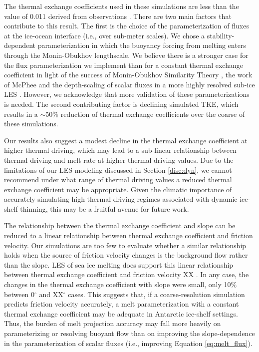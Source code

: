 \documentclass[draft]{agujournal2019}
\begin{document}
The thermal exchange coefficients used in these simulations are less than the value of 0.011 derived from observations \cite{jenkins_observation_2010}. There are two main factors that contribute to this result. The first is the choice of the parameterization of fluxes at the ice-ocean interface (i.e., over sub-meter scales). We chose a stability-dependent parameterization in which the buoyancy forcing from melting enters through the Monin-Obukhov lengthscale. We believe there is a stronger case for the flux parameterization we implement than for a constant thermal exchange coefficient in light of the success of Monin-Obukhov Similarity Theory \cite{monin_basic_1954}, the work of McPhee \cite{mcphee_air-ice-ocean_2008} and the depth-scaling of scalar fluxes in a more highly resolved sub-ice LES \cite{vreugdenhil_stratification_2019}. However, we acknowledge that more validation of these parameterizations is needed. The second contributing factor is declining simulated TKE, which results in a $\sim$50\% reduction of thermal exchange coefficients over the coarse of these simulations. 

Our results also suggest a modest decline in the thermal exchange coefficient at higher thermal driving, which may lead to a sub-linear relationship between thermal driving and melt rate at higher thermal driving values. Due to the limitations of our LES modeling discussed in Section \ref{disc:dyn}, we cannot recommend under what range of thermal driving values a reduced thermal exchange coefficient may be appropriate. Given the climatic importance of accurately simulating high thermal driving regimes associated with dynamic ice-shelf thinning, this may be a fruitful avenue for future work.

The relationship between the thermal exchange coefficient and slope can be reduced to a linear relationship between thermal exchange coefficient and friction velocity. Our simulations are too few to evaluate whether a similar relationship holds when the source of friction velocity changes is the background flow rather than the slope. LES of sea ice melting does support this linear relationship between thermal exchange coefficient and friction velocity XX \cite{ramudu_large_2018}. In any case, the changes in the thermal exchange coefficient with slope were small, only 10\% between 0$^{\circ}$ and XX$^{\circ}$ cases. This suggests that, if a coarse-resolution simulation predicts friction velocity accurately, a melt parameterization with a constant thermal exchange coefficient may be adequate in Antarctic ice-shelf settings. Thus, the burden of melt projection accuracy may fall more heavily on parameterizing or resolving buoyant flow than on improving the slope-dependence in the parameterization of scalar fluxes (i.e., improving Equation \ref{eq:melt_flux}).
\end{document}
